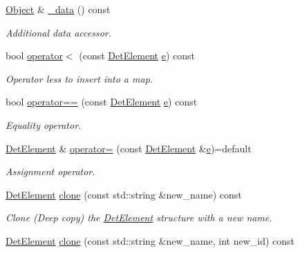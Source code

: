 \begin{DoxyCompactItemize}
\hyperlink{class_d_d4hep_1_1_geometry_1_1_det_element_a4e44e860d6e5827d9f42a4aea3a4f288}{Object} \& \hyperlink{class_d_d4hep_1_1_geometry_1_1_det_element_a4b7fa2ffe881a6699e88f5f24541b350}{\+\_\+data} () const
\begin{DoxyCompactList}\small\item\em Additional data accessor. \end{DoxyCompactList}\item 
bool \hyperlink{class_d_d4hep_1_1_geometry_1_1_det_element_ab8f9bd08591075ee3ebd58d21181e6e4}{operator$<$} (const \hyperlink{class_d_d4hep_1_1_geometry_1_1_det_element}{Det\+Element} \hyperlink{_volumes_8cpp_a8a9a1f93e9b09afccaec215310e64142}{e}) const
\begin{DoxyCompactList}\small\item\em Operator less to insert into a map. \end{DoxyCompactList}\item 
bool \hyperlink{class_d_d4hep_1_1_geometry_1_1_det_element_a755fd2e796eb14878f1f4c6fd6e8cee5}{operator==} (const \hyperlink{class_d_d4hep_1_1_geometry_1_1_det_element}{Det\+Element} \hyperlink{_volumes_8cpp_a8a9a1f93e9b09afccaec215310e64142}{e}) const
\begin{DoxyCompactList}\small\item\em Equality operator. \end{DoxyCompactList}\item 
\hyperlink{class_d_d4hep_1_1_geometry_1_1_det_element}{Det\+Element} \& \hyperlink{class_d_d4hep_1_1_geometry_1_1_det_element_a1270db841e8de34bef10a51e48bfd2e5}{operator=} (const \hyperlink{class_d_d4hep_1_1_geometry_1_1_det_element}{Det\+Element} \&\hyperlink{_volumes_8cpp_a8a9a1f93e9b09afccaec215310e64142}{e})=default
\begin{DoxyCompactList}\small\item\em Assignment operator. \end{DoxyCompactList}\item 
\hyperlink{class_d_d4hep_1_1_geometry_1_1_det_element}{Det\+Element} \hyperlink{class_d_d4hep_1_1_geometry_1_1_det_element_a652d67b71b8eb61044567e9dc48ee60b}{clone} (const std\+::string \&new\+\_\+name) const
\begin{DoxyCompactList}\small\item\em Clone (Deep copy) the \hyperlink{class_d_d4hep_1_1_geometry_1_1_det_element}{Det\+Element} structure with a new name. \end{DoxyCompactList}\item 
\hyperlink{class_d_d4hep_1_1_geometry_1_1_det_element}{Det\+Element} \hyperlink{class_d_d4hep_1_1_geometry_1_1_det_element_ac946f1a284bb734c093e20d8968e064e}{clone} (const std\+::string \&new\+\_\+name, int new\+\_\+id) const

\end{DoxyCompactItemize}
